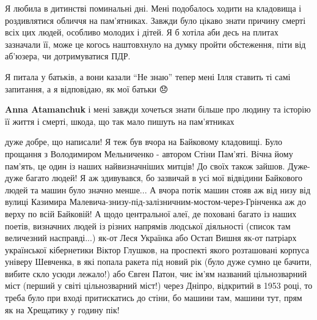  
 
 
 
 

\qqSecCmt


Я любила в дитинстві поминальні дні. Мені подобалось ходити на кладовища і
роздивлятися обличчя на пам'ятниках. Завжди було цікаво знати причину смерті
всіх цих людей, особливо молодих і дітей. Я б хотіла аби десь на плитах
зазначали її, може це когось наштовхнуло на думку пройти обстеження, піти від
аб'юзера, чи дотримуватися ПДР.

Я питала у батьків, а вони казали \enquote{Не знаю} тепер мені Ілля ставить ті самі
запитання, а я відповідаю, як мої батьки 😞

\begin{itemize} %
\textbf{Anna Atamanchuk} і мені завжди хочеться знати більше про людину та історію її життя і смерті, шкода, що так мало пишуть на пам'ятниках
\end{itemize} %


дуже добре, що написали! Я теж був вчора на Байковому кладовищі. Було прощання
з Володимиром Мельниченко - автором Стіни Пам'яті. Вічна йому пам'ять, це один
із наших найвизначніших митців! До своїх також зайшов. Дуже-дуже багато людей!
Я аж здивувався, бо зазвичай в усі мої відвідини Байкового людей та машин було
значно менше... А вчора потік машин стояв аж від низу від вулиці Казимира
Малевича-знизу-під-залізничним-мостом-через-Грінченка аж до верху по всій
Байковій! А щодо центральної алеї, де поховані багато із наших поетів,
визначних людей із різних напрямів людської діяльності (список там величезний
насправді...) як-от Леся Українка або Остап Вишня як-от патріарх української
кібернетики Віктор Глушков, на проспекті якого розташовані корпуса універу
Шевченка, в які попала ракета під новий рік (було дуже сумно це бачити, вибите
скло усюди лежало!) або Євген Патон, чиє ім'ям названий цільнозварний міст
(перший у світі цільнозварний міст!) через Дніпро, відкритий в 1953 році, то
треба було при вході притискатись до стіни, бо машини там, машини тут, прям як
на Хрещатику у годину пік!

